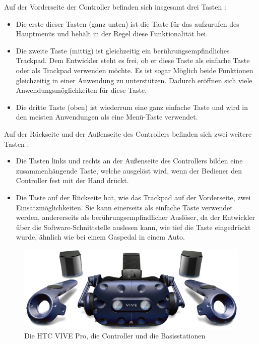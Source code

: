Auf der Vorderseite der Controller befinden sich insgesamt drei Tasten \cite{29}:
\begin{itemize}
	\item Die erste dieser Tasten (ganz unten) ist die Taste für das aufzurufen des Hauptmenüs und behält in der Regel diese Funktionalität bei.
	\item Die zweite Taste (mittig) ist gleichzeitig ein berührungsempfindliches Trackpad. Dem 
	Entwickler steht es frei, ob er diese Taste als einfache Taste oder als Trackpad verwenden 
	möchte. Es ist sogar Möglich beide Funktionen gleichzeitig in einer Anwendung zu 
	unterstützen. Dadurch eröffnen sich viele Anwendungsmöglichkeiten für diese Taste.
	\item Die dritte Taste (oben) ist wiederrum eine ganz einfache Taste und wird in den meisten 
	Anwendungen als eine Menü-Taste verwendet.
\end{itemize}
Auf der Rückseite und der Außenseite des Controllers befinden sich zwei weitere Tasten \cite{29}:
\begin{itemize}
	\item Die Tasten links und rechts an der Außenseite des Controllers bilden eine zusammenhängende Taste, welche ausgelöst wird, wenn der Bediener den Controller fest mit der Hand drückt.
	\item Die Taste auf der Rückseite hat, wie das Trackpad auf der Vorderseite, zwei 
	Einsatzmöglichkeiten. Sie kann einerseits als einfache Taste verwendet werden, andererseits 
	als berührungsempfindlicher Auslöser, da der Entwickler über die Software-Schnittstelle 
	auslesen kann, wie tief die Taste eingedrückt wurde, ähnlich wie bei einem Gaspedal in
	einem Auto.
\end{itemize}
\begin{figure}[h]
	\centering
	\includegraphics[width=0.6\linewidth]{Bilder/A26_Vivepro2}
	\caption{Die HTC VIVE Pro, die Controller und die Basisstationen \cite{A26}}
	\label{fig:ViveproKit}
\end{figure}
